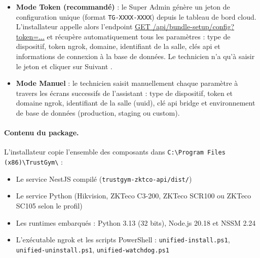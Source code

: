 ﻿\documentclass[../main.tex]{subfiles}
\begin{document}
\begin{itemize}
  \item \textbf{Mode Token (recommand\'{e})} : le Super Admin g\'{e}n\`{e}re un jeton de configuration unique (format \texttt{TG-XXXX-XXXX}) depuis le tableau de bord cloud. L'installateur appelle alors l'endpoint \url{GET /api/bundle-setup/config?token=...} et r\'{e}cup\`{e}re automatiquement tous les param\`{e}tres : type de dispositif, token ngrok, domaine, identifiant de la salle, cl\'{e}s \acrshort{api} et informations de connexion \`{a} la base de donn\'{e}es. Le technicien n'a qu'\`{a} saisir le jeton et cliquer sur \og{} Suivant \fg{}.
  \item \textbf{Mode Manuel} : le technicien saisit manuellement chaque param\`{e}tre \`{a} travers les \'{e}crans successifs de l'assistant : type de dispositif, token et domaine ngrok, identifiant de la salle (\acrshort{uuid}), cl\'{e} \acrshort{api} bridge et environnement de base de donn\'{e}es (production, staging ou custom).
\end{itemize}

\paragraph{Contenu du package.}
\begin{sloppypar}
L'installateur copie l'ensemble des composants dans \texttt{C:\textbackslash{}Program Files (x86)\textbackslash{}TrustGym\textbackslash{}} :
\end{sloppypar}

\begin{itemize}
  \item Le service NestJS compil\'{e} (\texttt{trustgym-zktco-api/dist/})
  \item Le service Python (Hikvision, ZKTeco C3-200, ZKTeco SCR100 ou ZKTeco SC105 selon le profil)
  \item Les runtimes embarqu\'{e}s : Python 3.13 (32 bits), Node.js 20.18 et NSSM 2.24
  \item L'ex\'{e}cutable ngrok et les scripts PowerShell :
        \texttt{unified-install.ps1}, \texttt{unified-uninstall.ps1}, \texttt{unified-watchdog.ps1}
\end{itemize}
\end{document}
